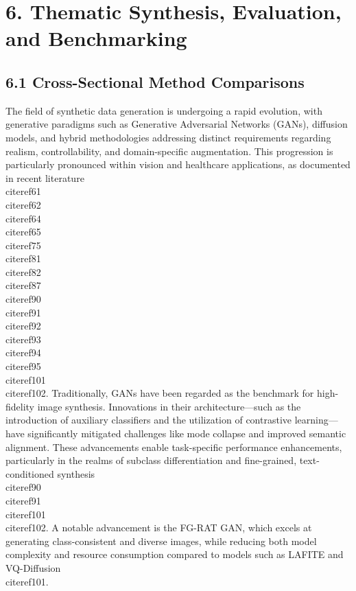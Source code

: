 \documentclass[11pt]{article}
\begin{document}
\section{6. Thematic Synthesis, Evaluation, and Benchmarking}

\subsection{6.1 Cross-Sectional Method Comparisons}

The field of synthetic data generation is undergoing a rapid evolution, with generative paradigms such as Generative Adversarial Networks (GANs), diffusion models, and hybrid methodologies addressing distinct requirements regarding realism, controllability, and domain-specific augmentation. This progression is particularly pronounced within vision and healthcare applications, as documented in recent literature \\cite{ref61}\\cite{ref62}\\cite{ref64}\\cite{ref65}\\cite{ref75}\\cite{ref81}\\cite{ref82}\\cite{ref87}\\cite{ref90}\\cite{ref91}\\cite{ref92}\\cite{ref93}\\cite{ref94}\\cite{ref95}\\cite{ref101}\\cite{ref102}. Traditionally, GANs have been regarded as the benchmark for high-fidelity image synthesis. Innovations in their architecture—such as the introduction of auxiliary classifiers and the utilization of contrastive learning—have significantly mitigated challenges like mode collapse and improved semantic alignment. These advancements enable task-specific performance enhancements, particularly in the realms of subclass differentiation and fine-grained, text-conditioned synthesis \\cite{ref90}\\cite{ref91}\\cite{ref101}\\cite{ref102}. A notable advancement is the FG-RAT GAN, which excels at generating class-consistent and diverse images, while reducing both model complexity and resource consumption compared to models such as LAFITE and VQ-Diffusion \\cite{ref101}.
\end{document}
